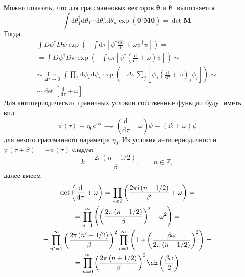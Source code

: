 \documentclass[a4paper, 14pt]{extarticle}
\begin{document}
\begin{hiProb}[Задача 3]
\end{hiProb}
\begin{sol}
Можно показать, что для грассманновых векторов $\boldsymbol{\theta}$ и $\boldsymbol{\theta}^\dagger$ выполняется
\[
\int \mathrm{d} \theta_1^\dagger \mathrm{d} \theta_1
\cdots \mathrm{d} \theta_n^\dagger \mathrm{d} \theta_n
\exp \left( \boldsymbol{\theta}^\dagger \boldsymbol{M\theta} \right) =\det \boldsymbol{M}
.\] 
Тогда
\begin{multline*}
	\int D\psi^\dagger D\psi \exp \left( 
	-\int \mathrm{d} \tau \left[ 
\psi^\dagger \frac{\mathrm{d} \psi}{\mathrm{d} \tau}
+\omega \psi^\dagger \psi\right] \right)=\\=
\int D\psi^\dagger D\psi \exp \left( 
	-\int \mathrm{d} \tau \left[ 
		\psi^\dagger \left(\frac{\mathrm{d} }{\mathrm{d} \tau}
+\omega  \right)\psi\right] \right)\sim \\\sim 
\lim_{\Delta \tau \to 0} 
\int \prod_{i}^{}  \mathrm{d} \psi^\dagger_i \mathrm{d} \psi_i \exp \left( 
	-\Delta \tau \sum_{j}^{} \left[ 
		\psi^\dagger_j \left(\frac{\mathrm{d} }{\mathrm{d} \tau}
+\omega  \right)_j\psi_j\right] \right)\sim \\\sim 
\det \left[ \frac{\mathrm{d} }{\mathrm{d} \tau}+\omega \right] 
.\end{multline*} 
Для антипериодических граничных условий собственные функции
будут иметь вид
\[
	\psi(\tau)= \eta_0 \mathrm{e} ^{\mathrm{i}  k\tau}
	\implies \left( \frac{\mathrm{d} }{\mathrm{d} \tau}
	+\omega\right) \psi=\left( \mathrm{i} k+\omega \right) \psi
 \] 
для некого грассманного параметра $\eta_0$.
Из условия антипериодичности $\psi(\tau+\beta)=-\psi(\tau)$ 
следует
\[
	k=\frac{2\pi (n- 1/2)}{\beta},\qquad
	n \in \mathbb{Z}
,\] 
далее имеем
\begin{multline*}
	\det \left( \frac{\mathrm{d} }{\mathrm{d} \tau}+
	\omega\right) 
	= \prod_{n \in \mathbb{Z}}^{} 
	\left( \frac{2\pi \mathrm{i} \left( n- 1 /2 \right) }{\beta}+\omega \right) =\\=
	\prod_{n=1}^{\infty} \left( \left( 
	\frac{2\pi \left( n- 1 /2 \right) }{\beta}\right) ^2+\omega^2\right) =\\=
	\prod_{n'=1}^{\infty} \left( \frac{2\pi \left( n' -1 /2 \right) }{\beta} \right) ^2 \prod_{n=1}^{\infty} 
	\left( 1+ \left( \frac{\beta \omega}{2\pi\left(n- 1 /2  \right) } \right) ^2 \right)=\\=
	  \prod_{n=0}^{\infty} \left( \frac{2\pi\left( n+1 /2 \right) }{\beta} \right) ^{2}
\ch \left( \frac{\beta \omega}{2} \right)   

\end{multline*}
\end{sol}
\end{document}
